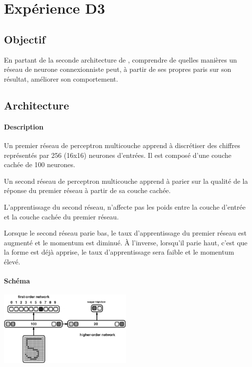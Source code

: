 \section{Expérience D3} \label{expD3}
  \subsection{Objectif}
    En partant de la seconde architecture de \cite{Cleeremans_2007}, 
    comprendre de quelles manières un réseau de neurone connexionniste peut, à partir de ses propres paris
    sur son résultat, améliorer son comportement.
  
  
  \subsection{Architecture}
    \paragraph{Description}
      Un premier réseau de perceptron multicouche apprend à discrétiser des chiffres représentés
      par 256 (16x16) neurones d'entrées. Il est composé d'une couche cachée de 100 neurones.
      
      Un second réseau de perceptron multicouche apprend à parier sur la qualité de la réponse
      du premier réseau à partir de sa couche cachée.
      
      L'apprentissage du second réseau, n'affecte pas les poids entre la couche d'entrée et la 
      couche cachée du premier réseau.
      
      Lorsque le second réseau parie bas, le taux d'apprentissage du premier réseau est augmenté
      et le momentum est diminué. À l'inverse, lorsqu'il parie haut, c'est que la forme est déjà
      apprise, le taux d'apprentissage sera faible et le momentum élevé.

    \paragraph{Schéma}
      \begin{center}
	\includegraphics[width=250px]{data/expD1/schema.png}
      \end{center}
      
